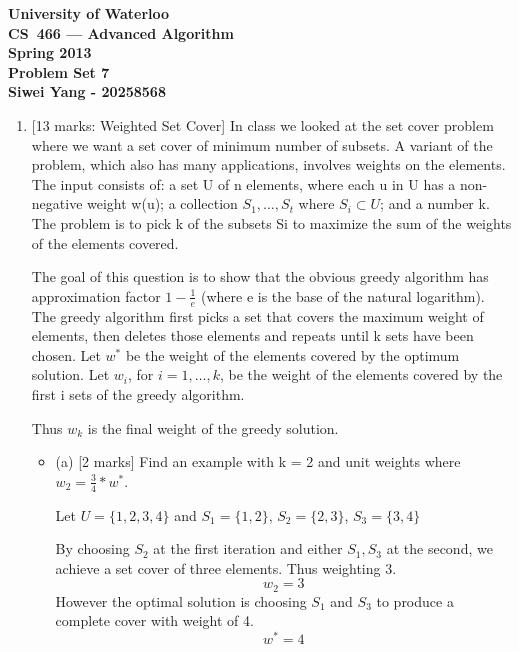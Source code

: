 \documentclass[12pt]{article}
\begin{document}
\begin{center}
\large\bf University of Waterloo\\
CS~466 --- Advanced Algorithm\\
Spring 2013\\
Problem Set 7\\
Siwei Yang - 20258568\\
\end{center}
\bigskip

\begin{enumerate}

\item{} [13 marks: Weighted Set Cover]
In class we looked at the set cover problem where we want a set cover of minimum number of subsets. A variant of the problem, which also has many applications, involves weights on the elements. The input consists of: a set U of n elements, where each u in U has a non-negative weight w(u); a collection $S_{1}, \ldots, S_{t}$ where $S_{i} \subset U$; and a number k. The problem is to pick k of the subsets Si to maximize the sum of the weights of the elements covered.

The goal of this question is to show that the obvious greedy algorithm has approximation factor $1-\frac{1}{e}$ (where e is the base of the natural logarithm). The greedy algorithm first picks a set that covers the maximum weight of elements, then deletes those elements and repeats until k sets have been chosen. Let $w^{*}$ be the weight of the elements covered by the optimum solution. Let $w_{i}$, for $i = 1, \ldots, k$, be the weight of the elements covered by the first i sets of the greedy algorithm.

Thus $w_{k}$ is the final weight of the greedy solution.

\begin{itemize}
\item{(a)} [2 marks]
Find an example with k = 2 and unit weights where $w_{2} = \frac{3}{4} * w^{*}$.


Let $U = \{1, 2, 3, 4\}$ and $S_{1} = \{1, 2\}$, $S_{2} = \{2, 3\}$, $S_{3} = \{3, 4\}$


By choosing $S_{2}$ at the first iteration and either $S_{1}, S_{3}$ at the second, we achieve a set cover of three elements. Thus weighting 3.
\begin{equation}
w_{2} = 3
\end{equation}
However the optimal solution is choosing $S_{1}$ and $S_{3}$ to produce a complete cover with weight of 4.
\begin{equation}
w^{*} = 4
\end{equation}


\end{itemize}
\end{enumerate}
\end{document}
